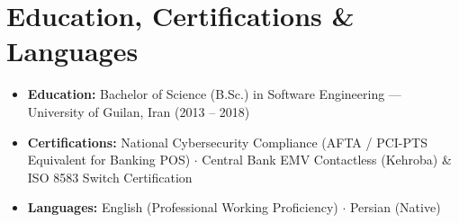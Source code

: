\documentclass[letterpaper,10pt]{article}
\newcommand{\resumeItem}[1]{
  \item\small{#1}
}
\begin{document}
\section{Education, Certifications \& Languages}
\begin{itemize}
  \resumeItem{\textbf{Education:} Bachelor of Science (B.Sc.) in Software Engineering — University of Guilan, Iran (2013 -- 2018)}
  \resumeItem{\textbf{Certifications:} National Cybersecurity Compliance (AFTA / PCI-PTS Equivalent for Banking POS) $\cdot$ Central Bank EMV Contactless (Kehroba) \& ISO 8583 Switch Certification}
  \resumeItem{\textbf{Languages:} English (Professional Working Proficiency) $\cdot$ Persian (Native)}
\end{itemize}
\end{document}
